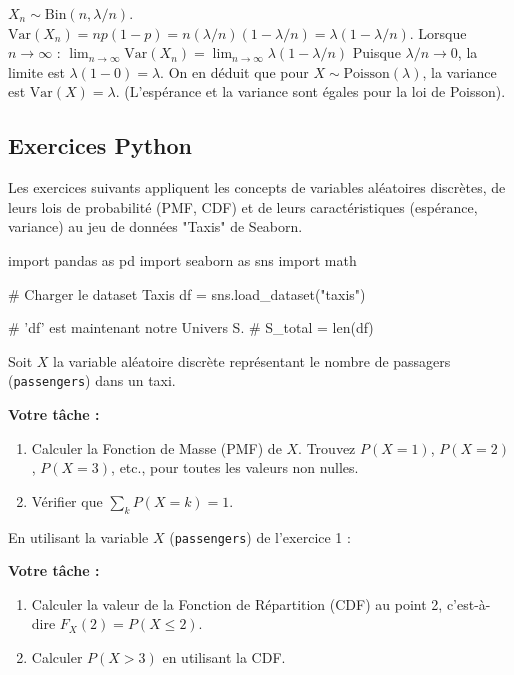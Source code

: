 \begin{correctionbox}
$X_n \sim \text{Bin}(n, \lambda/n)$.
$\text{Var}(X_n) = np(1-p) = n(\lambda/n)(1 - \lambda/n) = \lambda(1 - \lambda/n)$.
Lorsque $n \to \infty$ :
$\lim_{n \to \infty} \text{Var}(X_n) = \lim_{n \to \infty} \lambda(1 - \lambda/n)$
Puisque $\lambda/n \to 0$, la limite est $\lambda(1 - 0) = \lambda$.
On en déduit que pour $X \sim \text{Poisson}(\lambda)$, la variance est $\text{Var}(X) = \lambda$.
(L'espérance et la variance sont égales pour la loi de Poisson).
\end{correctionbox}

\subsection{Exercices Python}

Les exercices suivants appliquent les concepts de variables aléatoires discrètes, de leurs lois de probabilité (PMF, CDF) et de leurs caractéristiques (espérance, variance) au jeu de données "Taxis" de Seaborn.

\begin{codecell}
import pandas as pd
import seaborn as sns
import math

# Charger le dataset Taxis
df = sns.load_dataset("taxis")

# 'df' est maintenant notre Univers S.
# S_total = len(df)
\end{codecell}

\begin{exercicebox}
Soit $X$ la variable aléatoire discrète représentant le nombre de passagers (\texttt{passengers}) dans un taxi.

\textbf{Votre tâche :}
\begin{enumerate}
    \item Calculer la Fonction de Masse (PMF) de $X$. Trouvez $P(X=1)$, $P(X=2)$, $P(X=3)$, etc., pour toutes les valeurs non nulles.
    \item Vérifier que $\sum_{k} P(X=k) = 1$.
\end{enumerate}
\end{exercicebox}

\begin{exercicebox}
En utilisant la variable $X$ (\texttt{passengers}) de l'exercice 1 :

\textbf{Votre tâche :}
\begin{enumerate}
    \item Calculer la valeur de la Fonction de Répartition (CDF) au point 2, c'est-à-dire $F_X(2) = P(X \le 2)$.
    \item Calculer $P(X > 3)$ en utilisant la CDF.
\end{enumerate}
\end{exercicebox}

